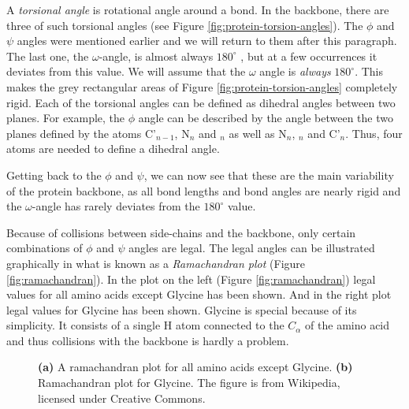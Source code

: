 A \textit{torsional angle} is rotational angle around a bond. In the
backbone, there are three of such torsional angles (see Figure
\ref{fig:protein-torsion-angles}). The $\phi$ and $\psi$ angles were
mentioned earlier and we will return to them after this paragraph. The
last one, the $\omega$-angle, is almost always $180^{\circ}$
\cite{probik}, but at a few occurrences it deviates from this
value. We will assume that the $\omega$ angle is \textit{always}
$180^{\circ}$. This makes the grey rectangular areas of Figure
\ref{fig:protein-torsion-angles} completely rigid.  Each of the
torsional angles can be defined as dihedral angles between two
planes. For example, the $\phi$ angle can be described by the angle
between the two planes defined by the atoms C'$_{n-1}$, N$_n$ and \Ca
$_n$ as well as N$_n$, \Ca $_n$ and C'$_n$. Thus, four atoms are
needed to define a dihedral angle.

Getting back to the $\phi$ and $\psi$, we can now see that these are
the main variability of the protein backbone, as all bond lengths and
bond angles are nearly rigid and the $\omega$-angle has rarely
deviates from the $180^\circ$ value. 

Because of collisions between side-chains and the backbone, only
certain combinations of $\phi$ and $\psi$ angles are legal. The legal
angles can be illustrated graphically in what is known as a
\textit{Ramachandran plot} (Figure \ref{fig:ramachandran}). In the
plot on the left (Figure \ref{fig:ramachandran}) legal values for all
amino acids except Glycine has been shown. And in the right plot legal
values for Glycine has been shown. Glycine is special because of its
simplicity. It consists of a single H atom connected to the $C_\alpha$
of the amino acid and thus collisions with the backbone is hardly a
problem.

\begin{figure}
	\centering
    \caption{\textbf{(a)} A ramachandran plot for all amino
      acids except Glycine. \textbf{(b)}  Ramachandran plot
      for Glycine. The figure is from Wikipedia, licensed under Creative Commons.}
\end{figure}

